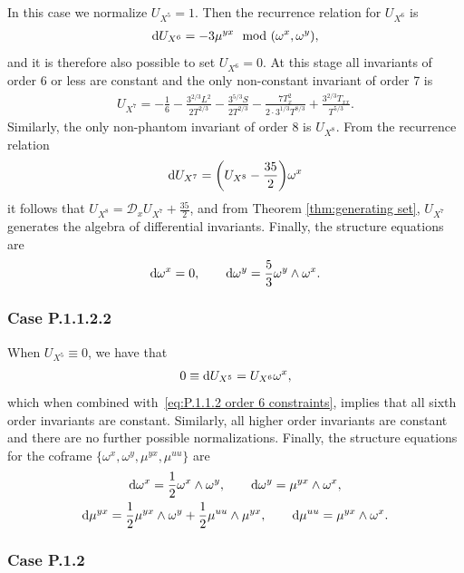 \documentclass[10pt,a4paper]{amsart}
\numberwithin{equation}{section}
\newcommand{\D}{\mathcal{D}}
\begin{document}
In this case we normalize $U_{X^5}=1$. Then the recurrence relation for $U_{X^6}$ is
\begin{gather*}
{\rm d}U_{X^6}=-3\mu^{yx} \mod(\omega^x,\omega^y),
\end{gather*}
and it is therefore also possible to set $U_{X^6}=0$. At this stage all invariants of order 6 or less are constant and the only non-constant invariant of order 7 is
\begin{gather*}
U_{X^7} = -\frac{1}{6}-\frac{3^{2/3}L^2}{2T^{2/3}} - \frac{3^{5/3}S}{2T^{2/3}}-\frac{7T_x^2}{2\cdot 3^{1/3}T^{8/3}}+\frac{3^{2/3}T_{xx}}{T^{5/3}}.
\end{gather*}
Similarly, the only non-phantom invariant of order 8 is $U_{X^8}$. From the recurrence relation
\begin{gather*}
{\rm d}U_{X^7} = \bigg(U_{X^8}-\frac{35}{2}\bigg)\omega^x
\end{gather*}
it follows that $U_{X^8} = \D_xU_{X^7}+\frac{35}{2}$, and from Theorem \ref{thm:generating set}, $U_{X^7}$ generates the algebra of differential invariants. Finally, the structure equations are
\begin{gather*}
{\rm d}\omega^x = 0,\qquad {\rm d}\omega^y=\frac{5}{3}\omega^y\wedge\omega^x.
\end{gather*}

\subsubsection{Case P.1.1.2.2}

When $U_{X^5} \equiv 0$, we have that
\begin{gather*}
0 \equiv {\rm d}U_{X^5} = U_{X^6}\omega^x,
\end{gather*}
which when combined with~\eqref{eq:P.1.1.2 order 6 constraints}, implies that all sixth order invariants are constant. Similarly, all higher order invariants are constant and there are no further possible normalizations. Finally, the structure equations for the coframe $\{\omega^x,\omega^y,\mu^{yx},\mu^{uu}\}$ are
\begin{gather*}
{\rm d}\omega^x=\frac{1}{2}\omega^x\wedge \omega^y,\qquad
{\rm d}\omega^y = \mu^{yx}\wedge \omega^x,
\\
{\rm d}\mu^{yx} = \frac{1}{2}\mu^{yx}\wedge \omega^y + \frac{1}{2}\mu^{uu}\wedge \mu^{yx},\qquad
{\rm d}\mu^{uu} = \mu^{yx}\wedge \omega^x.
\end{gather*}

\subsubsection{Case P.1.2}
\end{document}
